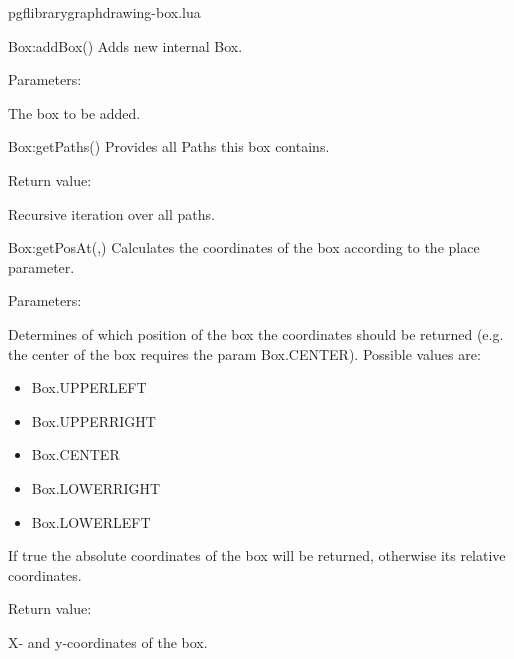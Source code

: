 
\begin{filedescription}{pgflibrarygraphdrawing-box.lua}


\begin{luacommand}{{Box:addBox}()}
Adds new internal Box.

Parameters:
\begin{parameterdescription}
	\item[\meta{box}] The box to be added.
\end{parameterdescription}



\end{luacommand}
\begin{luacommand}{{Box:getPaths}()}
Provides all Paths this box contains.


Return value:
\begin{parameterdescription} 
  \item[] Recursive iteration over all paths.
\end{parameterdescription}


\end{luacommand}
\begin{luacommand}{{Box:getPosAt}(,)}
Calculates the coordinates of the box according to the place parameter.

Parameters:
\begin{parameterdescription}
	\item[\meta{place}] Determines of which position of the box the coordinates should be returned (e.g. the center of the box requires the param Box.CENTER). Possible values are: \begin{itemize} \item Box.UPPERLEFT \item Box.UPPERRIGHT \item Box.CENTER \item Box.LOWERRIGHT \item Box.LOWERLEFT \end{itemize}\item[\meta{absolute}] If true the absolute coordinates of the box will be returned, otherwise its relative coordinates.
\end{parameterdescription}


Return value:
\begin{parameterdescription} 
  \item[] X- and y-coordinates of the box.
\end{parameterdescription}



\end{luacommand}
\end{filedescription}
